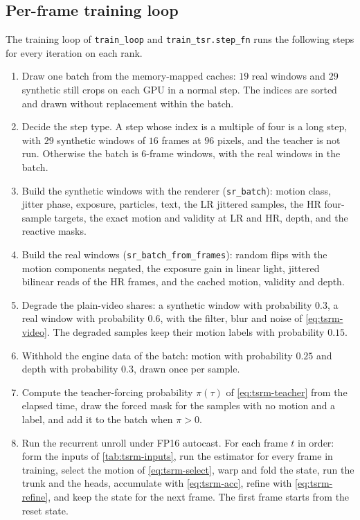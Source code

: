 \subsection{Per-frame training loop}\label{sec:tsrm-loop}

The training loop of \texttt{train\_loop} and \texttt{train\_tsr.step\_fn} runs the following steps for every iteration on each rank.

\begin{enumerate}
\item Draw one batch from the memory-mapped caches: $19$ real windows and $29$ synthetic still crops on each GPU in a normal step. The indices are sorted and drawn without replacement within the batch.
\item Decide the step type. A step whose index is a multiple of four is a long step, with $29$ synthetic windows of $16$ frames at $96$ pixels, and the teacher is not run. Otherwise the batch is $6$-frame windows, with the real windows in the batch.
\item Build the synthetic windows with the renderer (\texttt{sr\_batch}): motion class, jitter phase, exposure, particles, text, the LR jittered samples, the HR four-sample targets, the exact motion and validity at LR and HR, depth, and the reactive masks.
\item Build the real windows (\texttt{sr\_batch\_from\_frames}): random flips with the motion components negated, the exposure gain in linear light, jittered bilinear reads of the HR frames, and the cached motion, validity and depth.
\item Degrade the plain-video shares: a synthetic window with probability $0.3$, a real window with probability $0.6$, with the filter, blur and noise of \cref{eq:tsrm-video}. The degraded samples keep their motion labels with probability $0.15$.
\item Withhold the engine data of the batch: motion with probability $0.25$ and depth with probability $0.3$, drawn once per sample.
\item Compute the teacher-forcing probability $\pi(\tau)$ of \cref{eq:tsrm-teacher} from the elapsed time, draw the forced mask for the samples with no motion and a label, and add it to the batch when $\pi>0$.
\item Run the recurrent unroll under FP16 autocast. For each frame $t$ in order: form the inputs of \cref{tab:tsrm-inputs}, run the estimator for every frame in training, select the motion of \cref{eq:tsrm-select}, warp and fold the state, run the trunk and the heads, accumulate with \cref{eq:tsrm-acc}, refine with \cref{eq:tsrm-refine}, and keep the state for the next frame. The first frame starts from the reset state.

\end{enumerate}
